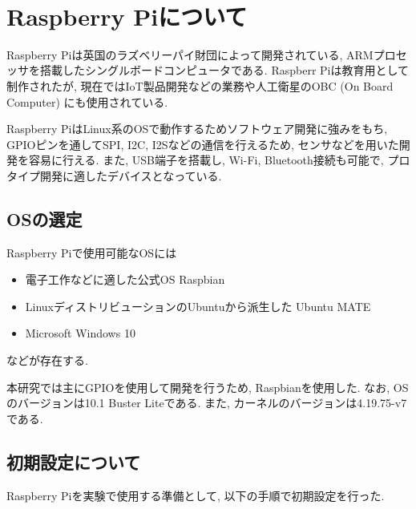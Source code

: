 \
\section{Raspberry Piについて}\label{about-raspberry}

Raspberry Piは英国のラズベリーパイ財団によって開発されている, ARMプロセッサを搭載したシングルボードコンピュータである. Raspberr
Piは教育用として制作されたが, 現在ではIoT製品開発などの業務や人工衛星のOBC (On Board Computer) にも使用されている. 

Raspberry PiはLinux系のOSで動作するためソフトウェア開発に強みをもち, GPIOピンを通してSPI, I2C, I2Sなどの通信を行えるため, センサなどを用いた開発を容易に行える. また, USB端子を搭載し, Wi-Fi, Bluetooth接続も可能で, プロタイプ開発に適したデバイスとなっている. 

\subsection{OSの選定}\label{choose-os}

Raspberry Piで使用可能なOSには

\begin{itemize}
\tightlist
\item
  電子工作などに適した公式OS Raspbian
\item
  LinuxディストリビューションのUbuntuから派生した Ubuntu MATE
\item
  Microsoft Windows 10
\end{itemize}

などが存在する. 

本研究では主にGPIOを使用して開発を行うため, Raspbianを使用した. なお, OSのバージョンは10.1
Buster Liteである. また, カーネルのバージョンは4.19.75-v7である. 

\subsection{初期設定について}\label{about-setup}

Raspberry Piを実験で使用する準備として, 以下の手順で初期設定を行った. 

